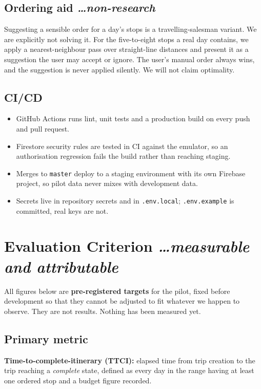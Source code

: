 \documentclass[11pt,a4paper]{article}
\newcommand{\BvrHint}[1]{%
  {\normalfont\normalsize\itshape\hfill #1}}
\begin{document}
\subsection{Ordering aid %
\BvrHint{\ldots non-research}}
Suggesting a sensible order for a day's stops is a
travelling-salesman variant. We are explicitly not
solving it. For the five-to-eight stops a real day
contains, we apply a nearest-neighbour pass over
straight-line distances and present it as a suggestion
the user may accept or ignore. The user's manual order
always wins, and the suggestion is never applied
silently. We will not claim optimality.

\subsection{CI/CD}
\begin{itemize}[leftmargin=0.7cm]
    \item GitHub Actions runs lint, unit tests and a
      production build on every push and pull request.
    \item Firestore security rules are tested in CI
      against the emulator, so an authorisation
      regression fails the build rather than reaching
      staging.
    \item Merges to \texttt{master} deploy to a staging
      environment with its own Firebase project, so
      pilot data never mixes with development data.
    \item Secrets live in repository secrets and in
      \texttt{.env.local}; \texttt{.env.example} is
      committed, real keys are not.
\end{itemize}

\section{Evaluation Criterion %
\BvrHint{\ldots measurable and attributable}}
All figures below are \textbf{pre-registered targets}
for the pilot, fixed before development so that they
cannot be adjusted to fit whatever we happen to
observe. They are not results. Nothing has been
measured yet.

\subsection{Primary metric}
\textbf{Time-to-complete-itinerary (TTCI):} elapsed
time from trip creation to the trip reaching a
\emph{complete} state, defined as every day in the
range having at least one ordered stop and a budget
figure recorded.
\end{document}
